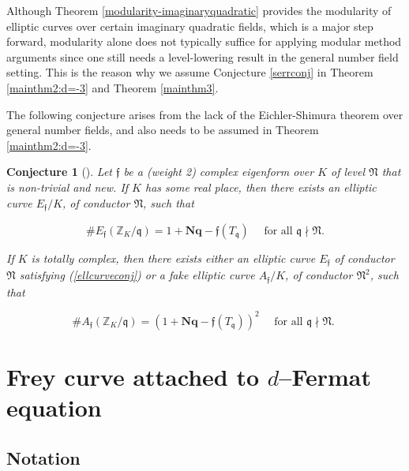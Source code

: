 \documentclass[]{article}
\newtheorem{conjecture}{Conjecture}
\begin{document}
Although Theorem \ref{modularity-imaginaryquadratic} provides the modularity of elliptic curves over certain imaginary quadratic fields, which is a major step forward, modularity alone does not typically suffice for applying modular method arguments since one still needs a level-lowering result in the general number field setting. This is the reason why we assume Conjecture \ref{serrconj} in Theorem \ref{mainthm2:d=-3} and Theorem \ref{mainthm3}.

The following conjecture arises from the lack of the Eichler-Shimura theorem over general number fields, and also needs to be assumed in Theorem \ref{mainthm2:d=-3}.
 

\begin{conjecture}[{\cite[Conjecture 4.1]{csengun2018asymptotic}}]\label{fakellcurve}
Let $\mathfrak{f}$ be a (weight 2) complex eigenform over $K$ of level $\mathfrak{N}$ that is non-trivial and new. If $K$ has some real place, then there exists an elliptic curve $E_{\mathfrak{f}} / K$, of conductor $\mathfrak{N}$, such that

\begin{equation}\label{ellcurveconj}
 \# E_{\mathfrak{f}}\left(\mathbb{Z}_K / \mathfrak{q}\right)=1+\mathbf{N q}-\mathfrak{f}\left(T_{\mathfrak{q}}\right) \quad \text { for all } \mathfrak{q} \nmid \mathfrak{N} .   
\end{equation}




If $K$ is totally complex, then there exists either an elliptic curve $E_{\mathfrak{f}}$ of conductor $\mathfrak{N}$ satisfying (\ref{ellcurveconj}) or a fake elliptic curve $A_{\mathfrak{f}} / K$, of conductor $\mathfrak{N}^2$, such that

\begin{equation}\label{fakeellcurveconj}
\# A_{\mathfrak{f}}\left(\mathbb{Z}_K / \mathfrak{q}\right)=\left(1+\mathbf{N q}-\mathfrak{f}\left(T_{\mathfrak{q}}\right)\right)^2 \quad \text { for all } \mathfrak{q} \nmid \mathfrak{N} \text {. }
\end{equation}
\end{conjecture}


\section{Frey curve attached to \texorpdfstring{$d$}{d}--Fermat equation}

\subsection{Notation}
\end{document}
